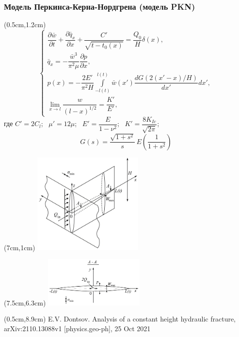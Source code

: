 \documentclass{beamer}
\begin{document}
\begin{frame}
\frametitle{Модель Перкинса-Керна-Нордгрена (модель PKN)}

\scriptsize

\begin{textblock*}{7cm}(0.5cm,1.2cm)
$$
\begin{cases}
\dfrac{\partial\bar{w}}{\partial t}+\dfrac{\partial\bar{q}_x}{\partial x}+\dfrac{C'}{\sqrt{t-t_0(x)}}=\dfrac{Q_0}{H}\delta(x),\\[15pt]
\bar{q}_x=-\dfrac{\bar{w}^3}{\pi^2\mu}\dfrac{\partial p}{\partial x},\\[15pt]
p(x)=-\dfrac{2E'}{\pi^2H}\displaystyle\int\limits_{-l(t)}^{l(t)}\bar{w}(x')\dfrac{dG(2(x'-x)/H)}{dx'}dx',\\[22pt]
\displaystyle\lim_{x\to l}\dfrac{w}{(l-x)^{1/2}}=\dfrac{K'}{E'},
\end{cases}
$$
где $C'=2C_l$; $\,\,\,\mu'=12\mu$; $\,\,\,E'=\dfrac{E}{1-\nu^2}$; $\,\,\,K'=\dfrac{8K_{Ic}}{\sqrt{2\pi}}$;
$$
G(s)=\frac{\sqrt{1+s^2}}{s}\,E\!\left(\frac{1}{1+s^2}\right)
$$
\end{textblock*}

\begin{textblock*}{7cm}(7cm,1cm)
\includegraphics[width=5.5cm]{pkn_model_3D.jpg}
\end{textblock*}

\begin{textblock*}{7cm}(7.5cm,6.3cm)
\includegraphics[width=5cm]{pkn_model_A-A_plane.jpg}
\end{textblock*}

\begin{textblock*}{6cm}(0.5cm,8.9cm)
\tiny
\textcolor{lit_gray}{E.V. Dontsov. Analysis of a constant height hydraulic fracture, arXiv:2110.13088v1 [physics.geo-ph], 25 Oct 2021}
\end{textblock*}

\normalsize

\end{frame}
\end{document}
